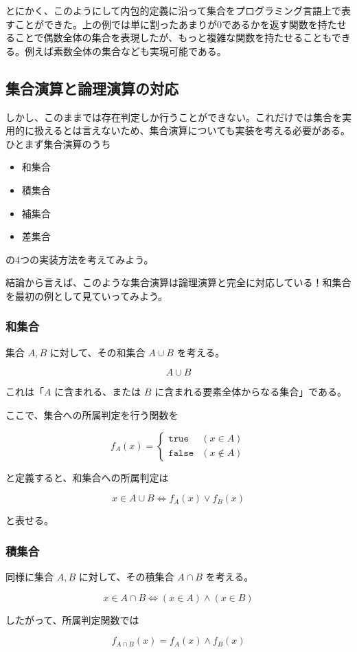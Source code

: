 \documentclass[a4paper,11pt]{ltjsarticle}
\begin{document}
とにかく、このようにして内包的定義に沿って集合をプログラミング言語上で表すことができた。上の例では単に割ったあまりが0であるかを返す関数を持たせることで偶数全体の集合を表現したが、もっと複雑な関数を持たせることもできる。例えば素数全体の集合なども実現可能である。
\subsection{集合演算と論理演算の対応}
しかし、このままでは存在判定しか行うことができない。これだけでは集合を実用的に扱えるとは言えないため、集合演算についても実装を考える必要がある。ひとまず集合演算のうち
\begin{itemize}
    \item 和集合
    \item 積集合
    \item 補集合
    \item 差集合
\end{itemize}
の4つの実装方法を考えてみよう。

結論から言えば、このような集合演算は論理演算と完全に対応している！和集合を最初の例として見ていってみよう。
\subsubsection{和集合}

集合 $A,B$ に対して、その和集合 $A\cup B$ を考える。

\[
A\cup B
\]

これは「$A$ に含まれる、または $B$ に含まれる要素全体からなる集合」である。

ここで、集合への所属判定を行う関数を

\[
f_A(x)=
\begin{cases}
\texttt{true} & (x\in A)\\
\texttt{false} & (x\notin A)
\end{cases}
\]

と定義すると、和集合への所属判定は

\[
x\in A\cup B
\iff
f_A(x)\lor f_B(x)
\]

と表せる。
\subsubsection{積集合}
同様に集合 $A,B$ に対して、その積集合 $A\cap B$ を考える。

\[
x\in A\cap B
\iff
(x\in A)\land(x\in B)
\]

したがって、所属判定関数では

\[
f_{A\cap B}(x)
=
f_A(x)\land f_B(x)
\]
\end{document}
